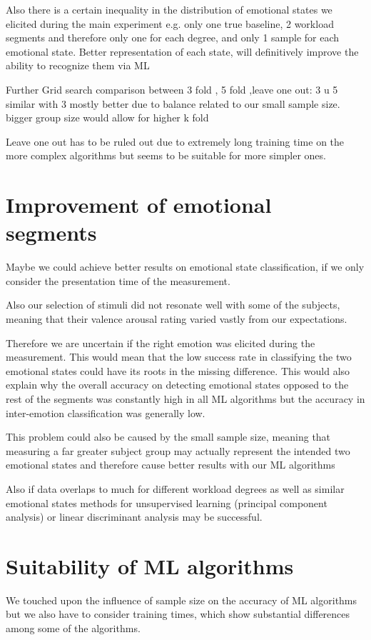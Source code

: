 Also there is a certain inequality in the distribution of emotional states we elicited during the main experiment e.g. only one true baseline, 2 workload segments and therefore only one for each degree, and only 1 sample for each emotional state. Better representation of each state, will definitively improve the ability to recognize them via ML  

Further Grid search comparison between 3 fold , 5 fold ,leave one out:
3 u 5 similar with 3 mostly better due to balance related to our small sample size. bigger group size would allow for higher k fold

Leave one out has to be ruled out due to extremely long training time on the more complex algorithms but seems to be suitable for more simpler ones.

\section{Improvement of emotional segments}
Maybe we could achieve better results on emotional state classification, if we only consider the presentation time of the measurement.

Also our selection of stimuli did not resonate well with some of the subjects, meaning that their valence arousal rating  varied vastly from our expectations.

Therefore  we are uncertain if the right emotion was elicited during the measurement. This would mean that the low success rate in classifying the two emotional states could have its roots in the missing difference. This would also explain why the overall accuracy on detecting emotional states opposed to the rest of the segments was constantly high in all ML algorithms but the accuracy in inter-emotion classification was generally low.

This problem could also be caused by the small sample size, meaning that measuring a far greater subject group may actually represent the intended two emotional states and therefore cause better results with our ML algorithms

Also if data overlaps to much for different workload degrees as well as similar emotional states methods for unsupervised learning (principal component analysis) or linear discriminant analysis may be successful.

\section{Suitability of ML algorithms}
We touched upon the influence of sample size on the accuracy of ML algorithms but we also have to consider training times, which show substantial differences among some of the algorithms.

